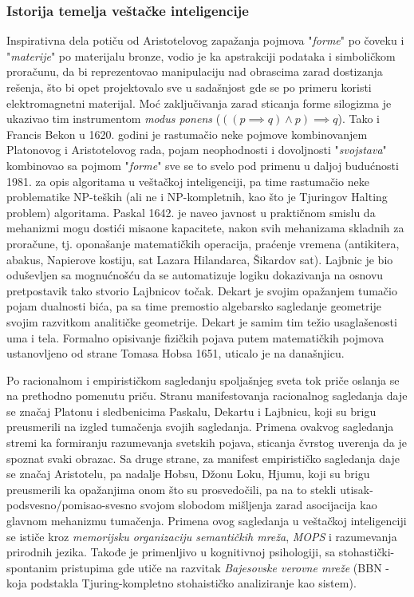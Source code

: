 \documentclass[fontsize=11bp, paper=a4]{scrartcl}
\begin{document}
\subsubsection{\normalsize{Istorija temelja veštačke inteligencije}}

Inspirativna dela potiču od Aristotelovog zapažanja pojmova "\textit{forme}" po čoveku i "\textit{materije}" po materijalu bronze, vodio je ka apstrakciji podataka i simboličkom proračunu, da bi reprezentovao manipulaciju nad obrascima zarad dostizanja rešenja, što bi opet projektovalo sve u sadašnjost gde se po primeru koristi elektromagnetni materijal. Moć zaključivanja zarad sticanja forme silogizma je ukazivao tim instrumentom \textit{modus ponens} ($((p\implies q)\land p)\implies q$).
Tako i Francis Bekon u 1620. godini je rastumačio neke pojmove kombinovanjem Platonovog i Aristotelovog rada, pojam neophodnosti i dovoljnosti "\textit{svojstava}" kombinovao sa pojmom "\textit{forme}" sve se to svelo pod primenu u daljoj budućnosti 1981. za opis algoritama u veštačkoj inteligenciji, pa time rastumačio neke problematike NP-teških (ali ne i NP-kompletnih\cite{nondeterministic}, kao što je Tjuringov Halting problem) algoritama. 
Paskal 1642. je naveo javnost u praktičnom smislu da mehanizmi mogu dostići misaone kapacitete, nakon svih mehanizama skladnih za proračune, tj. oponašanje matematičkih operacija, praćenje vremena (antikitera, abakus, Napierove kostiju, sat Lazara Hilandarca\cite{lazar}, Šikardov sat). Lajbnic je bio oduševljen sa mognućnošću da se automatizuje logiku dokazivanja na osnovu pretpostavik tako stvorio Lajbnicov točak. 
Dekart je svojim opažanjem tumačio pojam dualnosti bića, pa sa time premostio algebarsko sagledanje geometrije svojim razvitkom analitičke geometrije. Dekart je samim tim težio usaglašenosti uma i tela.
Formalno opisivanje fizičkih pojava putem matematičkih pojmova ustanovljeno od strane Tomasa Hobsa 1651, uticalo je na današnjicu.

Po racionalnom i empirističkom sagledanju spoljašnjeg sveta tok priče oslanja se na prethodno pomenutu priču. 
Stranu manifestovanja racionalnog sagledanja daje se značaj Platonu i sledbenicima Paskalu, Dekartu i Lajbnicu, koji su brigu preusmerili na izgled tumačenja svojih sagledanja.
Primena ovakvog sagledanja stremi ka formiranju razumevanja svetskih pojava, sticanja čvrstog uverenja da je spoznat svaki obrazac. 
Sa druge strane, za manifest empirističko sagledanja daje se značaj Aristotelu, pa nadalje Hobsu, Džonu Loku, Hjumu, koji su brigu preusmerili ka opažanjima onom što su prosvedočili, pa na to stekli utisak-podsvesno/pomisao-svesno svojom slobodom mišljenja zarad asocijacija kao glavnom mehanizmu tumačenja. 
Primena ovog sagledanja u veštačkoj inteligenciji se ističe kroz \textit{memorijsku organizaciju semantičkih mreža}, \textit{MOPS} i razumevanja prirodnih jezika. 
Takođe je primenljivo u kognitivnoj psihologiji, sa stohastički-spontanim pristupima gde utiče na razvitak \textit{Bajesovske verovne mreže} (BBN - koja podstakla Tjuring-kompletno stohaističko analiziranje kao sistem). 
\end{document}
